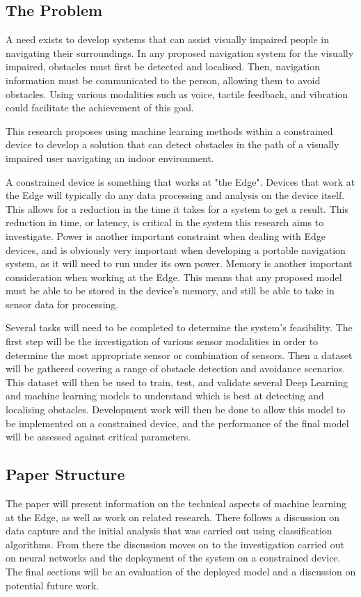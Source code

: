 \documentclass{svproc}
\begin{document}
\subsection{The Problem}
A need exists to develop systems that can assist visually impaired people in navigating their surroundings. 
In any proposed navigation system for the visually impaired, obstacles must first be detected and localised. 
Then, navigation information must be communicated to the person, allowing them to avoid obstacles. 
Using various modalities such as voice, tactile feedback, and vibration could facilitate the achievement of this goal.
 
This research proposes using machine learning methods within a constrained device to develop a solution that can 
detect obstacles in the path of a visually impaired user navigating an indoor environment. 

A constrained device is something that works at "the Edge". Devices that work at the Edge will typically do any 
data processing and analysis on the device itself. This allows for a reduction in the time it takes for a system to get a result. 
This reduction in time, or latency, is critical in the system this research aims to investigate. 
Power is another important constraint when dealing with Edge devices, and is obviously very important when 
developing a portable navigation system, as it will need to run under its own power. 
Memory is another important consideration when working at the Edge. This means that any proposed model 
must be able to be stored in the device's memory, and still be able to take in sensor data for processing. 

Several tasks will need to be completed to determine the system's feasibility. The first step will be the investigation 
of various sensor modalities in order to determine the most appropriate sensor or combination of sensors. 
Then a dataset will be gathered covering a range of obstacle detection and avoidance scenarios. This dataset will then 
be used to train, test, and validate several Deep Learning and machine learning models to understand which is 
best at detecting and localising obstacles. Development work will then be done to allow this model to be implemented on a 
constrained device, and the performance of the final model will be assessed against critical parameters.

\subsection{Paper Structure}
The paper will present information on the technical aspects of machine learning at the Edge, as well as work on related research. 
There follows a discussion on data capture and the initial analysis that was carried out using classification algorithms. From there 
the discussion moves on to the investigation carried out on neural networks and the deployment of the system on a constrained device. 
The final sections will be an evaluation of the deployed model and a discussion on potential future work.
\end{document}
